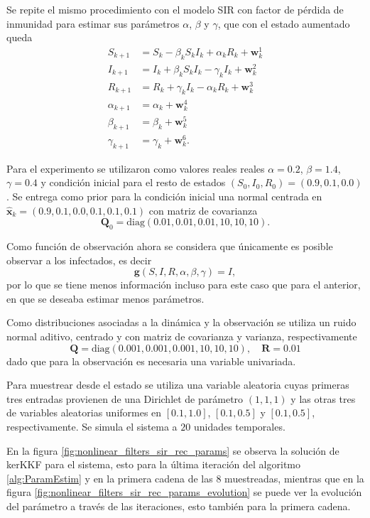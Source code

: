 Se repite el mismo procedimiento con el modelo SIR con factor de pérdida de inmunidad para estimar sus parámetros $\alpha$, $\beta$ y $\gamma$, que con el estado aumentado queda
\begin{equation*}
    \begin{aligned}
        S_{k+1} &= S_k - \beta_k S_k I_k + \alpha_k R_k + \mathbf{w}_k^1 \\
        I_{k+1} &= I_k + \beta_k S_k I_k - \gamma_k I_k + \mathbf{w}_k^2 \\
        R_{k+1} &= R_k + \gamma_k I_k - \alpha_k R_k + \mathbf{w}_k^3 \\
        \alpha_{k+1} &= \alpha_k + \mathbf{w}_k^4 \\
        \beta_{k+1} &= \beta_k + \mathbf{w}_k^5 \\
        \gamma_{k+1} &= \gamma_k + \mathbf{w}_k^6.
    \end{aligned}
\end{equation*}

Para el experimento se utilizaron como valores reales reales $\alpha = 0.2$, $\beta = 1.4$, $\gamma = 0.4$ y condición inicial para el resto de estados $(S_0, I_0, R_0) = (0.9, 0.1, 0.0)$. Se entrega como prior para la condición inicial una normal centrada en $\hat{\mathbf{x}}_k = (0.9, 0.1, 0.0, 0.1, 0.1, 0.1)$ con matriz de covarianza
\[
\mathbf{Q}_0 = \text{diag}(0.01, 0.01, 0.01, 10, 10, 10).
\]

Como función de observación ahora se considera que únicamente es posible observar a los infectados, es decir
\[
\mathbf{g}(S, I, R, \alpha, \beta, \gamma) = I,
\]
por lo que se tiene menos información incluso para este caso que para el anterior, en que se deseaba estimar menos parámetros.

Como distribuciones asociadas a la dinámica y la observación se utiliza un ruido normal aditivo, centrado y con matriz de covarianza y varianza, respectivamente
\[
\mathbf{Q} = \text{diag}(0.001, 0.001, 0.001, 10, 10, 10), \quad \mathbf{R} = 0.01
\]
dado que para la observación es necesaria una variable univariada.

Para muestrear desde el estado se utiliza una variable aleatoria cuyas primeras tres entradas provienen de una Dirichlet de parámetro $(1,1,1)$ y las otras tres de variables aleatorias uniformes en $[0.1, 1.0]$, $[0.1, 0.5]$ y $[0.1, 0.5]$, respectivamente. Se simula el sistema a $20$ unidades temporales.

En la figura \ref{fig:nonlinear_filters_sir_rec_params} se observa la solución de kerKKF para el sistema, esto para la última iteración del algoritmo \ref{alg:ParamEstim} y en la primera cadena de las $8$ muestreadas, mientras que en la figura \ref{fig:nonlinear_filters_sir_rec_params_evolution} se puede ver la evolución del parámetro a través de las iteraciones, esto también para la primera cadena.

